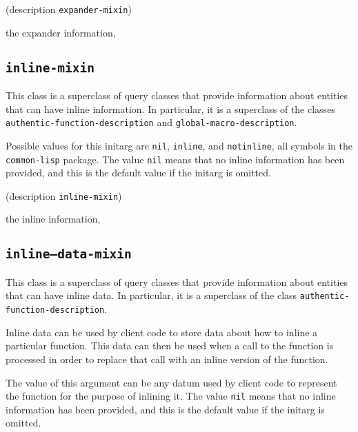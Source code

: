 {\footnotesize
{}
}

{\footnotesize
{} {(description {\tt expander-mixin})}
}

 the expander information, 

\subsection{\texttt{inline-mixin}}
\label{sec-inline-mixin}

{\footnotesize
{}
}

This class is a superclass of query classes that provide information
about entities that can have inline information.  In particular, it is a
superclass of the classes \texttt{authentic-function-description} and
\texttt{global-macro-description}.

{\footnotesize
{}
}

Possible values for this initarg are \texttt{nil}, \texttt{inline},
and \texttt{notinline}, all symbols in the \texttt{common-lisp}
package.  The value \texttt{nil} means that no inline information has
been provided, and this is the default value if the initarg is omitted.

{\footnotesize
{} {(description {\tt inline-mixin})}
}

 the inline information, 

\subsection{\texttt{inline--data-mixin}}
\label{sec-inline-data-mixin}

{\footnotesize
{}
}

This class is a superclass of query classes that provide information
about entities that can have inline data.  In particular, it is a
superclass of the class \texttt{authentic-function-description}.

Inline data can be used by client code to store data about how to
inline a particular function.  This data can then be used when a call
to the function is processed in order to replace that call with an
inline version of the function.

{\footnotesize
{}
}

The value of this argument can be any datum used by client code to
represent the function for the purpose of inlining it.  The value
\texttt{nil} means that no inline information has been provided, and
this is the default value if the initarg is omitted.

